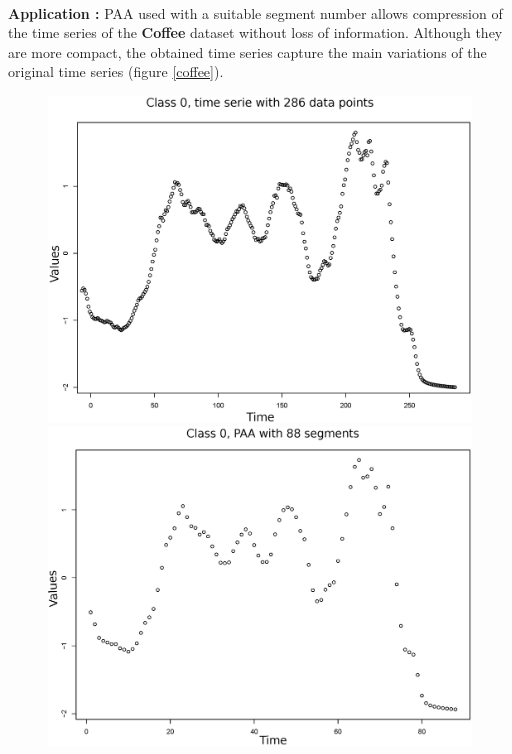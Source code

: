 \paragraph{}\textbf{Application : } 
PAA used with a suitable segment number allows compression of the time series of
the \textbf{Coffee} dataset without loss of information. Although they are more compact, the obtained time series
capture the main variations of the original time series (figure \ref{coffee}).

\begin{figure}[h]
\center
\includegraphics[scale=0.23]{images/coffee_0_ts}\includegraphics[scale=0.23]{images/coffee_0_paa_88}


\end{figure}
